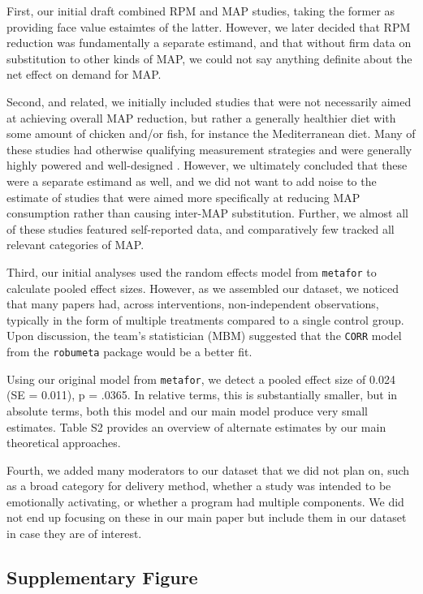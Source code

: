 \documentclass[sn-nature,referee,pdflatex]{sn-jnl}
\begin{document}
First, our initial draft combined RPM and MAP studies, taking the former
as providing face value estaimtes of the latter. However, we later
decided that RPM reduction was fundamentally a separate estimand, and
that without firm data on substitution to other kinds of MAP, we could
not say anything definite about the net effect on demand for MAP.

Second, and related, we initially included studies that were not
necessarily aimed at achieving overall MAP reduction, but rather a
generally healthier diet with some amount of chicken and/or fish, for
instance the Mediterranean diet. Many of these studies had otherwise
qualifying measurement strategies and were generally highly powered and
well-designed \citep{beresford2006}. However, we ultimately concluded
that these were a separate estimand as well, and we did not want to add
noise to the estimate of studies that were aimed more specifically at
reducing MAP consumption rather than causing inter-MAP substitution.
Further, we almost all of these studies featured self-reported data, and
comparatively few tracked all relevant categories of MAP.

Third, our initial analyses used the random effects model from
\texttt{metafor} to calculate pooled effect sizes. However, as we
assembled our dataset, we noticed that many papers had, across
interventions, non-independent observations, typically in the form of
multiple treatments compared to a single control group. Upon discussion,
the team's statistician (MBM) suggested that the \texttt{CORR} model
from the \texttt{robumeta} package would be a better fit.

Using our original model from \texttt{metafor}, we detect a pooled
effect size of 0.024 (SE = 0.011), p = .0365. In relative terms, this is
substantially smaller, but in absolute terms, both this model and our
main model produce very small estimates. Table S2 provides an overview
of alternate estimates by our main theoretical approaches.

Fourth, we added many moderators to our dataset that we did not plan on,
such as a broad category for delivery method, whether a study was
intended to be emotionally activating, or whether a program had multiple
components. We did not end up focusing on these in our main paper but
include them in our dataset in case they are of interest.

\subsection{Supplementary Figure}\label{sec5.2}
\end{document}
